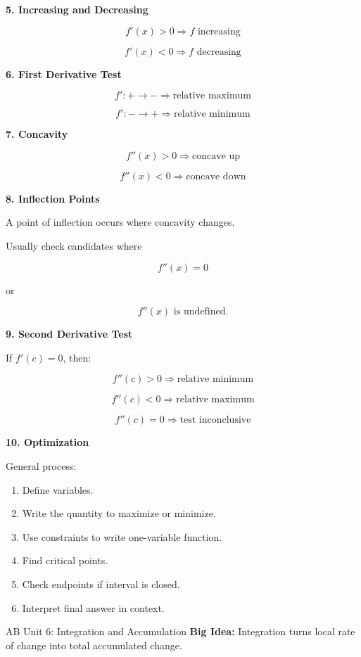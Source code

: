 \documentclass[11pt]{article}
\newcommand{\subtopic}[1]{
\vspace{0.45em}
\textcolor{novelPurpleDark}{\textbf{#1}}
}
\begin{document}
\subtopic{5. Increasing and Decreasing}

\[
f'(x)>0 \Rightarrow f\text{ increasing}
\]

\[
f'(x)<0 \Rightarrow f\text{ decreasing}
\]

\subtopic{6. First Derivative Test}

\[
f':+\to - \Rightarrow \text{relative maximum}
\]

\[
f':-\to + \Rightarrow \text{relative minimum}
\]

\subtopic{7. Concavity}

\[
f''(x)>0 \Rightarrow \text{concave up}
\]

\[
f''(x)<0 \Rightarrow \text{concave down}
\]

\subtopic{8. Inflection Points}

A point of inflection occurs where concavity changes.

Usually check candidates where

\[
f''(x)=0
\]

or

\[
f''(x)\text{ is undefined}.
\]

\subtopic{9. Second Derivative Test}

If \(f'(c)=0\), then:

\[
f''(c)>0 \Rightarrow \text{relative minimum}
\]

\[
f''(c)<0 \Rightarrow \text{relative maximum}
\]

\[
f''(c)=0 \Rightarrow \text{test inconclusive}
\]

\subtopic{10. Optimization}

General process:

\begin{enumerate}[leftmargin=1.5em]
\item Define variables.
\item Write the quantity to maximize or minimize.
\item Use constraints to write one-variable function.
\item Find critical points.
\item Check endpoints if interval is closed.
\item Interpret final answer in context.
\end{enumerate}

\newpage

\begin{unitbox}{AB Unit 6: Integration and Accumulation}
\textbf{Big Idea:} Integration turns local rate of change into total accumulated change.
\end{unitbox}
\end{document}

